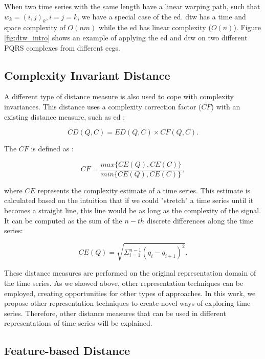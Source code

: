 When two time series with the same length have a linear warping path, such that $w_k=(i,j)_k, i=j=k$, we have a special case of the \gls{ed}. \gls{dtw} has a time and space complexity of $O(nm)$ while the \gls{ed} has linear complexity ($O(n)$). Figure \ref{fig:dtw_intro} shows an example of applying the \gls{ed} and \gls{dtw} on two different PQRS complexes from different \gls{ecg}s. 

\subsection{Complexity Invariant Distance}
\label{subsec:complexity}

A different type of distance measure is also used to cope with complexity invariances. This distance uses a complexity correction factor ($CF$) with an existing distance measure, such as \gls{ed} \cite{complexity}:

\begin{equation}
CD(Q,C) = ED(Q,C)\times CF(Q,C).
\end{equation}

The $CF$ is defined as \cite{complexity}:

\begin{equation}
CF = \frac{max\{CE(Q),CE(C)\}}{min\{CE(Q),CE(C)\}},
\end{equation}

where $CE$ represents the complexity estimate of a time series. This estimate is calculated based on the intuition that if we could  "stretch" a time series until it becomes a straight line, this line would be as long as the complexity of the signal. It can be computed as the sum of the $n-th$ discrete differences along the time series\cite{complexity}:

\begin{equation}
\label{eq:complexity}
CE(Q) = \sqrt{\Sigma^{n-1}_{i=1} (q_i - q_{i+1})^2}.
\end{equation}

These distance measures are performed on the original representation domain of the time series. As we showed above, other representation techniques can be employed, creating opportunities for other types of approaches. In this work, we propose other representation techniques to create novel ways of exploring time series. Therefore, other distance measures that can be used in different representations of time series will be explained. 

\subsection{Feature-based Distance}
\label{subsec:features_dist}

